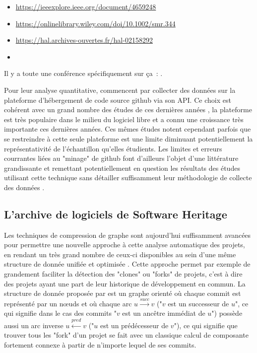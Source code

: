 
\begin{itemize}
    \item \url{https://ieeexplore.ieee.org/document/4659248}
    \item \url{https://onlinelibrary.wiley.com/doi/10.1002/smr.344}
    \item \url{https://hal.archives-ouvertes.fr/hal-02158292}
    \item {}
\end{itemize}

Il y a toute une conférence spécifiquement sur ça : .

Pour leur analyse quantitative, \textcite{signals-2019} commencent par collecter des données sur la plateforme
d'hébergement de code source \gls{github} via son \gls{API}. Ce choix est cohérent avec un grand nombre des
études de ces dernières années , la plateforme est très populaire dans le
milieu du logiciel libre et a connu une croissance très importante ces dernières années. Ces mêmes études
notent cependant parfois que se restreindre à cette seule plateforme est une limite diminuant potentiellement
la représentativité de l'échantillon qu'elles étudients. Les limites et erreurs courrantes liées au "minage"
de \gls{github} font d'ailleurs l'objet d'une littérature grandissante et remettant potentiellement en
question les résultats des études utilisant cette technique sans détailler suffisamment leur méthodologie de
collecte des données \parencites{mining-github-2014}{penumbra-oss-2022}.

\subsection{L'archive de logiciels de Software Heritage}
\label{ssec:swh-graph}

Les techniques de compression de graphe sont aujourd'hui suffisamment avancées pour permettre une nouvelle
approche à cette analyse automatique des projets, en rendant un très grand nombre de ceux-ci disponibles au
sein d'une même structure de donnée unifiée et optimisée . Cette approche permet
par exemple de grandement faciliter la détection des "\glspl{clone}" ou "\glspl{fork}" de projets, c'est à
dire des projets ayant une part de leur historique de développement en commun. La structure de donnée proposée
par \textcite{swh-graph-2020} est un graphe orienté où chaque \gls{commit} est représenté par un nœuds et où
chaque arc $u \xrightarrow{succ} v$ ("$v$ est un successeur de $u$", ce qui signifie dans le cas des
\glspl{commit} "$v$ est un ancêtre immédiat de $u$") possède aussi un arc inverse $u \xleftarrow{pred} v$
("$u$ est un prédécesseur de $v$"), ce qui signifie que trouver tous les "\gls{fork}" d'un projet se fait avec
un classique calcul de composante fortement connexe à partir de n'importe lequel de ses \glspl{commit}.

